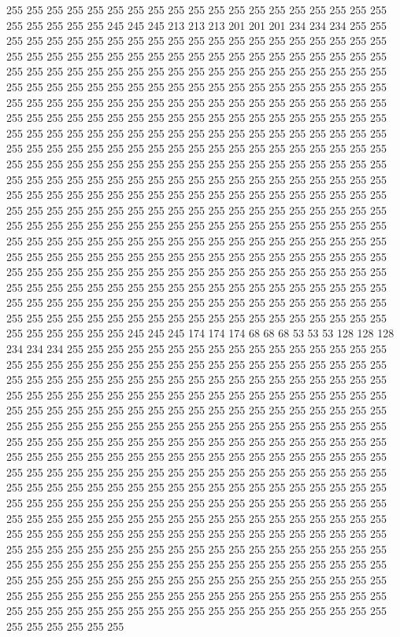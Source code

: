 255 255 255 255 255 255 255 255 255 255 255 255 255 255 255 255 255 255 255 255 255 255 255 255 245 245 245 213 213 213 201 201 201 234 234 234 255 255 255 255 255 255 255 255 255 255 255 255 255 255 255 255 255 255 255 255 255 255 255 255 255 255 255 255 255 255 255 255 255 255 255 255 255 255 255 255 255 255 255 255 255 255 255 255 255 255 255 255 255 255 255 255 255 255 255 255 255 255 255 255 255 255 255 255 255 255 255 255 255 255 255 255 255 255 255 255 255 255 255 255 255 255 255 255 255 255 255 255 
255 255 255 255 255 255 255 255 255 255 255 255 255 255 255 255 255 255 255 255 255 255 255 255 255 255 255 255 255 255 255 255 255 255 255 255 255 255 255 255 255 255 255 255 255 255 255 255 255 255 255 255 255 255 255 255 255 255 255 255 255 255 255 255 255 255 255 255 255 255 255 255 255 255 255 255 255 255 255 255 255 255 255 255 255 255 255 255 255 255 255 255 255 255 255 255 255 255 255 255 255 255 255 255 255 255 255 255 255 255 255 255 255 255 255 255 255 255 255 255 255 255 255 255 255 255 255 255 
255 255 255 255 255 255 255 255 255 255 255 255 255 255 255 255 255 255 255 255 255 255 255 255 255 255 255 255 255 255 255 255 255 255 255 255 255 255 255 255 255 255 255 255 255 255 255 255 255 255 255 255 255 255 255 255 255 255 255 255 255 255 255 255 255 255 255 255 255 255 255 255 255 255 255 255 255 255 255 255 255 255 255 255 255 255 255 255 255 255 255 255 255 255 255 255 255 255 255 255 255 255 255 255 255 255 255 255 255 255 255 255 255 255 255 255 255 255 255 255 255 255 255 255 255 255 255 255 
255 255 255 255 255 255 255 255 255 255 255 255 255 255 255 255 255 255 255 255 255 245 245 245 174 174 174 68 68 68 53 53 53 128 128 128 234 234 234 255 255 255 255 255 255 255 255 255 255 255 255 255 255 255 255 255 255 255 255 255 255 255 255 255 255 255 255 255 255 255 255 255 255 255 255 255 255 255 255 255 255 255 255 255 255 255 255 255 255 255 255 255 255 255 255 255 255 255 255 255 255 255 255 255 255 255 255 255 255 255 255 255 255 255 255 255 255 255 255 255 255 255 255 255 255 255 255 255 
255 255 255 255 255 255 255 255 255 255 255 255 255 255 255 255 255 255 255 255 255 255 255 255 255 255 255 255 255 255 255 255 255 255 255 255 255 255 255 255 255 255 255 255 255 255 255 255 255 255 255 255 255 255 255 255 255 255 255 255 255 255 255 255 255 255 255 255 255 255 255 255 255 255 255 255 255 255 255 255 255 255 255 255 255 255 255 255 255 255 255 255 255 255 255 255 255 255 255 255 255 255 255 255 255 255 255 255 255 255 255 255 255 255 255 255 255 255 255 255 255 255 255 255 255 255 255 255 
255 255 255 255 255 255 255 255 255 255 255 255 255 255 255 255 255 255 255 255 255 255 255 255 255 255 255 255 255 255 255 255 255 255 255 255 255 255 255 255 255 255 255 255 255 255 255 255 255 255 255 255 255 255 255 255 255 255 255 255 255 255 255 255 255 255 255 255 255 255 255 255 255 255 255 255 255 255 255 255 255 255 255 255 255 255 255 255 255 255 255 255 255 255 255 255 255 255 255 255 255 255 255 255 255 255 255 255 255 255 255 255 255 255 255 255 255 255 255 255 255 255 255 255 255 255 255 255 
